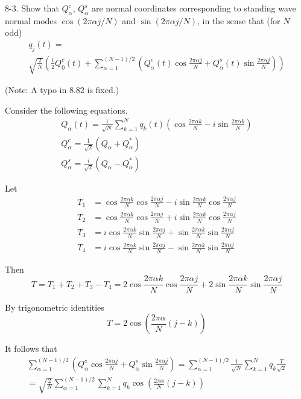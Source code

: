 \documentclass[12pt]{article}
\begin{document}
8-3.
Show that $Q_\alpha^c$, $Q_\alpha^s$ are normal coordinates
corresponding to standing wave normal modes
$\cos(2\pi\alpha j/N)$ and $\sin(2\pi\alpha j/N)$,
in the sense that (for $N$ odd)
\begin{multline*}
q_j(t)=
\\
\sqrt{\frac{2}{N}}\left(
\frac{1}{2}Q_0^c(t)
+\sum_{\alpha=1}^{(N-1)/2}
\left(
Q_\alpha^c(t)\cos\frac{2\pi\alpha j}{N}
+Q_\alpha^s(t)\sin\frac{2\pi\alpha j}{N}
\right)
\right)
\tag{8.82}
\end{multline*}

(Note: A typo in 8.82 is fixed.)

\bigskip
Consider the following equations.
\begin{gather*}
Q_\alpha(t)=\frac{1}{\sqrt N}\sum_{k=1}^Nq_k(t)
\left(
\cos\frac{2\pi\alpha k}{N}-i\sin\frac{2\pi\alpha k}{N}
\right)
\tag{8.77}
\\
Q_\alpha^c=\frac{1}{\sqrt2}(Q_\alpha+Q_\alpha^*)
\tag{8.79}
\\
Q_\alpha^s=\frac{i}{\sqrt2}(Q_\alpha-Q_\alpha^*)
\tag{8.80}
\end{gather*}

Let
\begin{align*}
T_1&=\cos\frac{2\pi\alpha k}{N}\cos\frac{2\pi\alpha j}{N}
-i\sin\frac{2\pi\alpha k}{N}\cos\frac{2\pi\alpha j}{N}
\\
T_2&=\cos\frac{2\pi\alpha k}{N}\cos\frac{2\pi\alpha j}{N}
+i\sin\frac{2\pi\alpha k}{N}\cos\frac{2\pi\alpha j}{N}
\\
T_3&=i\cos\frac{2\pi\alpha k}{N}\sin\frac{2\pi\alpha j}{N}
+\sin\frac{2\pi\alpha k}{N}\sin\frac{2\pi\alpha j}{N}
\\
T_4&=i\cos\frac{2\pi\alpha k}{N}\sin\frac{2\pi\alpha j}{N}
-\sin\frac{2\pi\alpha k}{N}\sin\frac{2\pi\alpha j}{N}
\end{align*}

Then
\begin{equation*}
T=T_1+T_2+T_3-T_4
=2\cos\frac{2\pi\alpha k}{N}\cos\frac{2\pi\alpha j}{N}
+2\sin\frac{2\pi\alpha k}{N}\sin\frac{2\pi\alpha j}{N}
\end{equation*}

By trigonometric identities
\begin{equation*}
T=2\cos\left(\frac{2\pi\alpha}{N}(j-k)\right)
\end{equation*}

It follows that
\begin{multline*}
\sum_{\alpha=1}^{(N-1)/2}
\left(Q_\alpha^c\cos\frac{2\pi\alpha j}{N}
+Q_\alpha^s\sin\frac{2\pi\alpha j}{N}\right)
=\sum_{\alpha=1}^{(N-1)/2}\frac{1}{\sqrt N}\sum_{k=1}^Nq_k\frac{T}{\sqrt2}
\\
=\sqrt{\frac{2}{N}}\sum_{\alpha=1}^{(N-1)/2}\sum_{k=1}^N
q_k\cos\left(\frac{2\pi\alpha}{N}(j-k)\right)
\end{multline*}

\end{document}
